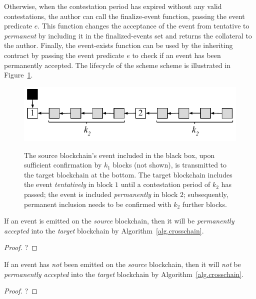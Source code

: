Otherwise, when the contestation period has expired without any valid
contestations, the author can call the \textsf{finalize-event} function, passing
the event predicate $e$. This function changes the acceptance of the event from
tentative to \emph{permanent} by including it in the \textsf{finalized-events}
set and returns the collateral to the author. Finally, the \textsf{event-exists}
function can be used by the inheriting contract by passing the event predicate
$e$ to check if an event has been permanently accepted. The lifecycle of the
scheme scheme is illustrated in Figure~\ref{fig.contestation}.

\begin{figure}
    \caption{The source blockchain's event included in the black box, upon
             sufficient confirmation by $k_1$ blocks (not shown), is transmitted
             to the target blockchain at the bottom. The target blockchain
             includes the event \emph{tentatively} in block $1$ until a
             contestation period of $k_2$ has passed; the event is included
             \emph{permanently} in block $2$; subsequently, permanent inclusion
             needs to be confirmed with $k_2$ further blocks.}
    \centering
    \includegraphics[width=0.6 \columnwidth,keepaspectratio]{figures/contestation.pdf}
    \label{fig.contestation}
\end{figure}

\begin{theorem}[Correctness]
  If an event is emitted on the \emph{source} blockchain, then it will be
  \emph{permanently accepted} into the \emph{target} blockchain by
  Algorithm~\ref{alg.crosschain}.
\end{theorem}
\begin{proof}
  ?
\end{proof}

\begin{theorem}[Security]
  If an event has \emph{not} been emitted on the \emph{source} blockchain, then
  it will \emph{not} be \emph{permanently accepted} into the \emph{target}
  blockchain by Algorithm~\ref{alg.crosschain}.
\end{theorem}
\begin{proof}
  ?
\end{proof}


